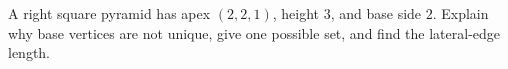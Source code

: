 A right square pyramid has apex $(2,2,1)$, height $3$, and base side $2$. Explain why base vertices are not unique, give one possible set, and find the lateral-edge length.
